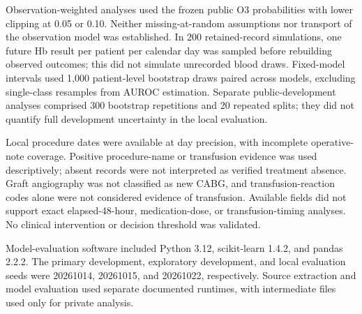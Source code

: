 \documentclass[pdflatex,sn-vancouver-num]{sn-jnl}
\begin{document}
Observation-weighted analyses used the frozen public O3 probabilities with lower clipping at 0.05 or 0.10. Neither missing-at-random assumptions nor transport of the observation model was established. In 200 retained-record simulations, one future Hb result per patient per calendar day was sampled before rebuilding observed outcomes; this did not simulate unrecorded blood draws. Fixed-model intervals used 1,000 patient-level bootstrap draws paired across models, excluding single-class resamples from AUROC estimation. Separate public-development analyses comprised 300 bootstrap repetitions and 20 repeated splits; they did not quantify full development uncertainty in the local evaluation.

Local procedure dates were available at day precision, with incomplete operative-note coverage. Positive procedure-name or transfusion evidence was used descriptively; absent records were not interpreted as verified treatment absence. Graft angiography was not classified as new CABG, and transfusion-reaction codes alone were not considered evidence of transfusion. Available fields did not support exact elapsed-48-hour, medication-dose, or transfusion-timing analyses. No clinical intervention or decision threshold was validated.

Model-evaluation software included Python 3.12, scikit-learn 1.4.2, and pandas 2.2.2. The primary development, exploratory development, and local evaluation seeds were 20261014, 20261015, and 20261022, respectively. Source extraction and model evaluation used separate documented runtimes, with intermediate files used only for private analysis.
\end{document}
